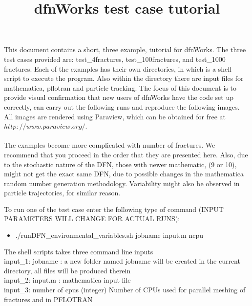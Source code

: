 \documentclass{article}
\begin{document}
\title{{\sc dfnWorks} test case tutorial}
\maketitle

This document contains a short, three example, tutorial for {\sc dfnWorks}. The three test cases provided are: test\_4fractures, test\_100fractures, and test\_1000 fractures.  Each of the examples has their own directories, in which is a shell script to execute the program. Also within the directory there are input files for mathematica, pflotran and particle tracking.
The focus of this document is to provide visual confirmation that new users of {\sc dfnWorks} have the code set up correctly, can carry out the following runs and reproduce the following images. 
All images are rendered using Paraview, which can be obtained for free at $http://www.paraview.org/$.\\\\
The examples become more complicated with number of fractures. 
We recommend that you proceed in the order that they are presented here. 
Also, due to the stochastic nature of the DFN, those with newer mathematic, (9 or 10), might not get the exact same DFN, due to possible changes in the mathematica random number generation methodology. 
Variability might also be observed in particle trajectories, for similar reason. 


To run one of the test case enter the following type of command (INPUT PARAMETERS WILL CHANGE FOR ACTUAL RUNS):

\begin{itemize}
\item ./runDFN\_environmental\_variables.sh jobname input.m ncpu
\end{itemize}

\noindent The shell scripts takes three command line inputs\\

\noindent input\_1: jobname : a new folder named jobname will be created in the current directory, all files will be produced therein\\
    
\noindent input\_2: input.m : mathematica input file\\

\noindent input\_3: number of cpus (integer) Number of CPUs used for parallel meshing of fractures and in {\sc PFLOTRAN}\\
\end{document}
